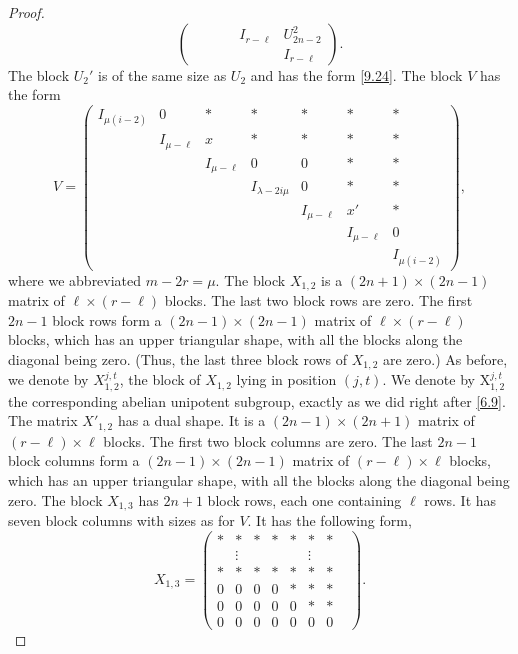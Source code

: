 \documentclass[12pts]{amsart}
\begin{document}
\begin{proof}
\begin{equation}
\begin{pmatrix}
& & &       &I_{r-\ell}&U^2_{2n-2}\\
& & &       & &I_{r-\ell}\end{pmatrix}.
\end{equation}
The block $U_2'$ is of the same size as $U_2$ and has the form
\eqref{9.24}. The block $V$ has the form
\begin{equation}\label{9.25}
V=\begin{pmatrix}I_{\mu(i-2)}&0&\ast&\ast&\ast&\ast&\ast\\&I_{\mu-\ell}&x&\ast&\ast&\ast&\ast\\&&I_{\mu-\ell}&0&0&\ast&\ast\\&&&I_{\lambda-2i\mu}&0&\ast&\ast\\&&&&I_{\mu-\ell}&x'&\ast\\&&&&&I_{\mu-\ell}&0\\&&&&&&I_{\mu(i-2)}\end{pmatrix},
\end{equation}
where we abbreviated $m-2r=\mu$. The block $X_{1,2}$ is a $(2n+1)\times (2n-1)$ matrix of $\ell\times (r-\ell)$ blocks. The last two block rows are zero. The first $2n-1$ block rows form a $(2n-1)\times (2n-1)$ matrix of $\ell\times (r-\ell)$ blocks, which has an upper triangular shape, with all the blocks along the diagonal being zero. (Thus, the last three block rows of $X_{1,2}$ are zero.) As before, we denote by $X_{1,2}^{j,t}$, the block of $X_{1,2}$ lying in position $(j,t)$. We denote by $\mathrm{X}_{1,2}^{j,t}$ the corresponding abelian unipotent subgroup, exactly as we did right after \eqref{6.9}. The matrix $X'_{1,2}$ has a dual shape. It is a $(2n-1)\times (2n+1)$ matrix of $(r-\ell)\times \ell$ blocks. The first two block columns are zero. The last $2n-1$ block columns form a $(2n-1)\times (2n-1)$ matrix of $(r-\ell)\times \ell$ blocks, which has an upper triangular shape, with all the blocks along the diagonal being zero. The block $X_{1,3}$ has $2n+1$ block rows, each one containing $\ell$ rows. It has seven block columns with sizes as for $V$. It has the following form,
\begin{equation}\label{9.26}
X_{1,3}=\begin{pmatrix}\ast&\ast&\ast&\ast&\ast&\ast&\ast\\&\vdots&&&&\vdots&&\\\ast&\ast&\ast&\ast&\ast&\ast&\ast\\0&0&0&0&\ast&\ast&\ast\\0&0&0&0&0&\ast&\ast\\0&0&0&0&0&0&0\end{pmatrix}.

\end{equation}
\end{proof}
\end{document}
